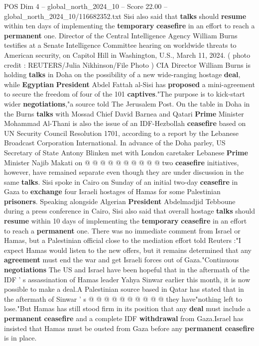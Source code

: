 \begin{textsample}{POS Dim 4 – global\_north\_2024\_10 – Score 22.00 – global\_north\_2024\_10/116682352.txt}  \label{ex:f4_pos_401}
Sisi also said that \textbf{talks} should \textbf{resume} within ten days of implementing the \textbf{temporary} \textbf{ceasefire} in an effort to reach a \textbf{permanent} one.
Director of the Central Intelligence Agency William Burns testifies at a Senate Intelligence Committee hearing on worldwide threats to American security, on Capitol Hill in Washington, U.S., March 11, 2024. ( photo credit : REUTERS/Julia Nikhinson/File Photo ) CIA Director William Burns is holding \textbf{talks} in Doha on the possibility of a new wide-ranging hostage \textbf{deal}, while \textbf{Egyptian} \textbf{President} Abdel Fattah al-Sisi has \textbf{proposed} a mini-agreement to secure the freedom of four of the 101 \textbf{captives}."The purpose is to kick-start wider \textbf{negotiations},"a source told The Jerusalem Post.
On the table in Doha in the Burns \textbf{talks} with Mossad Chief David Barnea and Qatari \textbf{Prime} Minister Mohammad Al-Thani is also the issue of an IDF-Hezbollah \textbf{ceasefire} based on UN Security Council Resolution 1701, according to a report by the Lebanese Broadcast Corporation International.
In advance of the Doha parley, US Secretary of State Antony Blinken met with London caretaker Lebanese \textbf{Prime} Minister Najib Makati on @ @ @ @ @ @ @ @ @ @ two \textbf{ceasefire} initiatives, however, have remained separate even though they are under discussion in the same \textbf{talks}.
Sisi spoke in Cairo on Sunday of an initial two-day \textbf{ceasefire} in Gaza to \textbf{exchange} four Israeli hostages of Hamas for some Palestinian \textbf{prisoners}.
Speaking alongside Algerian \textbf{President} Abdelmadjid Tebboune during a press conference in Cairo, Sisi also said that overall hostage \textbf{talks} should \textbf{resume} within 10 days of implementing the \textbf{temporary} \textbf{ceasefire} in an effort to reach a \textbf{permanent} one.
There was no immediate comment from Israel or Hamas, but a Palestinian official close to the mediation effort told Reuters :"I expect Hamas would listen to the new offers, but it remains determined that any \textbf{agreement} must end the war and get Israeli forces out of Gaza."Continuous \textbf{negotiations} The US and Israel have been hopeful that in the aftermath of the IDF ' s assassination of Hamas leader Yahya Sinwar earlier this month, it is now possible to make a deal.A Palestinian source based in Qatar has stated that in the aftermath of Sinwar ' s @ @ @ @ @ @ @ @ @ @ they have"nothing left to lose."But Hamas has still stood firm in its position that any \textbf{deal} must include a \textbf{permanent} \textbf{ceasefire} and a complete IDF \textbf{withdrawal} from Gaza.Israel has insisted that Hamas must be ousted from Gaza before any \textbf{permanent} \textbf{ceasefire} is in place.

\end{textsample}
